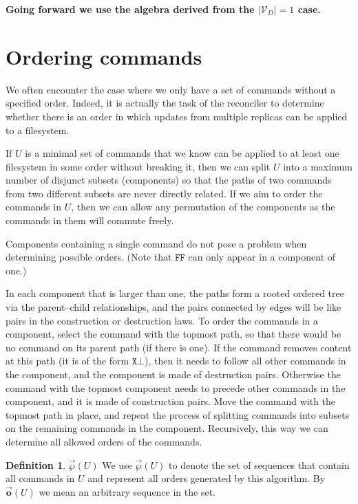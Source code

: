 \documentclass[12pt]{article}
\newcommand{\setvx}[1]{\mathcal{V}_{#1}}
\newcommand{\setd}{\setvx{D}}
\newcommand{\empt}{\bot}
\newcommand{\fscommand}[2]{{#1#2}}
\newcommand{\fsregcommandchar}[1]{\mathtt{#1}}
\newcommand{\fsregcommand}[2]{\fscommand{\fsregcommandchar{#1}}{\fsregcommandchar{#2}}}
\newcommand{\cff}{\fsregcommand{F}{F}}
\newcommand{\orderset}[1]{\vec{\wp}({#1})}
\newcommand{\ordered}[1]{\vec{\mathbf{o}}({#1})}
\theoremstyle{definition}
\newtheorem{mydef}{Definition}
\begin{document}
{\bf Going forward we use the algebra derived from the $|\setd|=1$ case.}

\section{Ordering commands}

We often encounter the case where we only have a set of commands without a specified order.
Indeed, it is actually the task of the reconciler to determine whether there is an order
in which updates from multiple replicas can be applied to a filesystem.

If $U$ is a minimal set of commands
that we know can be applied to at least one filesystem in some order without breaking it,
then we can split $U$ into a maximum number of disjunct subsets
(components) so that the paths of two commands from two different subsets are never directly related.
If we aim to order the commands in $U$, then we can allow any permutation of 
the components as the commands in them will commute freely.

Components containing a single command do not pose a problem when determining
possible orders.
(Note that $\cff$ can only appear in a component of one.)

In each component that is larger than one, the paths 
form a rooted ordered tree via the parent--child relationships,
and the pairs connected by edges will be like pairs in the
construction or destruction laws.
To order the commands in a component,
select the command with the topmost path, so that there would be no command
on its parent path (if there is one). 
If the command removes content at this path (it is of the form $\fsregcommand{X}{\empt}$), then it
needs to follow all other commands in the component, and
the component is made of destruction pairs.
Otherwise the command with the topmost component needs to precede other commands
in the component, and it is made of construction pairs.
Move the command with the topmost path in place, and
repeat the process of splitting commands into subsets on the remaining commands
in the component. Recursively, this way we can determine all allowed orders of the commands.

\begin{mydef}{$\orderset{U}$}
We use $\orderset{U}$ to denote the set of sequences that contain all commands in $U$
and represent all orders generated by this algorithm.
By $\ordered{U}$ we mean an arbitrary sequence in the set.
\end{mydef}
\end{document}
